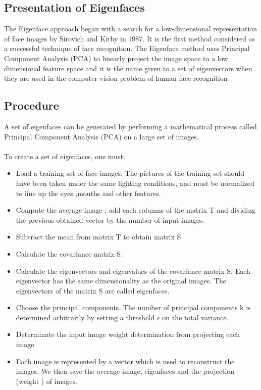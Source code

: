 \subsection{Presentation of Eigenfaces}


	
The Eigenface approach began with a search for a low-dimensional representation of face images by Sirovich and Kirby in 1987.
It is the first method considered as a successful technique of face recognition. The Eigenface method uses Principal Component Analysis (PCA) to linearly project the image space to a low dimensional feature space and it is the name given to a set of eigenvectors when they are used in the computer vision problem of human face recognition

\subsection{Procedure}

A set of eigenfaces can be generated by performing a mathematical process called Principal Component Analysis (PCA) on a large set of images.
\paragraph{}
To create a set of eigenfaces, one must:
\begin{itemize}
\item Load a training set of face images. The pictures of  the training set should have been taken under the same lighting conditions, and must be normalized to line up the eyes ,mouths and other features.
\item Compute the average image : add each columns of the matrix T and dividing the previous obtained vector by the number of input images.
\item Subtract the mean from matrix T to obtain matrix S
\item Calculate the covariance matrix S.
\item Calculate the eigenvectors and eigenvalues of the covariance matrix S. Each eigenvector has the same dimensionality as the original images. The eigenvectors of the matrix  S are called eigenfaces.
\item Choose the principal components. The number of principal components k is determined arbitrarily by setting a threshold $\epsilon$ on the total variance.
\item Determinate the input image weight determination from projecting each image
\item Each image is represented by a vector which is used to reconstruct the images. We then save the average image, eigenfaces and the projection (weight ) of images.
\end{itemize}

